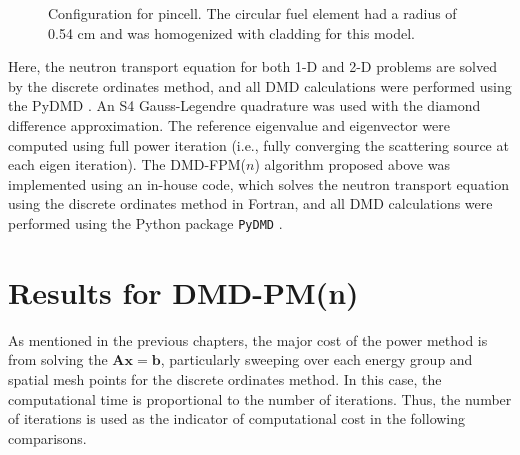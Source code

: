 \begin{figure}[htb]
    \centering
    \caption{Configuration for pincell.  The circular fuel element had a 
             radius of 0.54 cm and was homogenized with cladding for this 
             model.}
    \label{fig:pin_cell_config}
\end{figure}
Here, the neutron transport equation for both 1-D and 2-D problems are solved by the discrete ordinates method, and all DMD calculations were performed using the PyDMD \cite{pydmd}.
An S4 Gauss-Legendre quadrature was used with the diamond difference approximation.
The reference eigenvalue and eigenvector were computed using full power iteration (i.e., fully converging the scattering source at each eigen iteration).
The DMD-FPM($n$) algorithm proposed above was implemented using an in-house code, which solves the neutron transport equation using the discrete ordinates method in Fortran, and all DMD calculations were performed using the Python package {\tt PyDMD} \cite{pydmd}.


\section{Results for DMD-PM(n)}
As mentioned in the previous chapters, the major cost of the power method is from solving the $\mathbf{Ax =b}$, particularly sweeping over each energy group and spatial mesh points for the discrete ordinates method.
In this case, the computational time is proportional to the number of iterations.
Thus, the number of iterations is used as the indicator of computational cost in the following comparisons.

